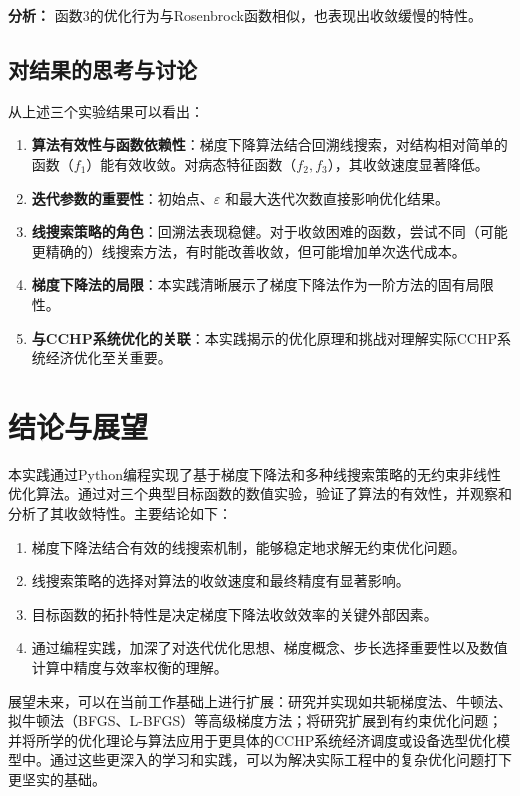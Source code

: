 \documentclass[12pt]{article} %
\begin{document}
\textbf{分析：} 函数3的优化行为与Rosenbrock函数相似，也表现出收敛缓慢的特性。

\subsection{对结果的思考与讨论}
从上述三个实验结果可以看出：
\begin{enumerate}
    \item \textbf{算法有效性与函数依赖性}：梯度下降算法结合回溯线搜索，对结构相对简单的函数（\(f_1\)）能有效收敛。对病态特征函数（\(f_2, f_3\)），其收敛速度显著降低。
    \item \textbf{迭代参数的重要性}：初始点、\(\varepsilon\) 和最大迭代次数直接影响优化结果。
    \item \textbf{线搜索策略的角色}：回溯法表现稳健。对于收敛困难的函数，尝试不同（可能更精确的）线搜索方法，有时能改善收敛，但可能增加单次迭代成本。
    \item \textbf{梯度下降法的局限}：本实践清晰展示了梯度下降法作为一阶方法的固有局限性。
    \item \textbf{与CCHP系统优化的关联}：本实践揭示的优化原理和挑战对理解实际CCHP系统经济优化至关重要。
\end{enumerate}

\section{结论与展望}
本实践通过Python编程实现了基于梯度下降法和多种线搜索策略的无约束非线性优化算法。通过对三个典型目标函数的数值实验，验证了算法的有效性，并观察和分析了其收敛特性。主要结论如下：
\begin{enumerate}
    \item 梯度下降法结合有效的线搜索机制，能够稳定地求解无约束优化问题。
    \item 线搜索策略的选择对算法的收敛速度和最终精度有显著影响。
    \item 目标函数的拓扑特性是决定梯度下降法收敛效率的关键外部因素。
    \item 通过编程实践，加深了对迭代优化思想、梯度概念、步长选择重要性以及数值计算中精度与效率权衡的理解。
\end{enumerate}

展望未来，可以在当前工作基础上进行扩展：研究并实现如共轭梯度法、牛顿法、拟牛顿法（BFGS、L-BFGS）等高级梯度方法；将研究扩展到有约束优化问题；并将所学的优化理论与算法应用于更具体的CCHP系统经济调度或设备选型优化模型中。通过这些更深入的学习和实践，可以为解决实际工程中的复杂优化问题打下更坚实的基础。
\end{document}
